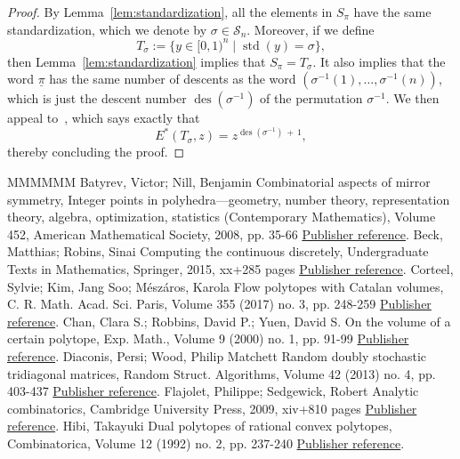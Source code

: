 \documentclass[11pt]{article}
\theoremstyle{definition}
\numberwithin{equation}{section}
\numberwithin{figure}{section}
\numberwithin{table}{section}
\DeclareMathOperator{\std}{std}
\DeclareMathOperator{\des}{des}
\newcommand{\calS}{\mathcal S}
\begin{document}
\begin{proof}
By Lemma~\ref{lem:standardization}, all the elements in $S_\pi$ have the same standardization, which we denote by $\sigma\in\calS_n$. Moreover, if we define
\[
T_\sigma:=\{ y\in[0,1)^n \mid \std(y)=\sigma \},
\]
then Lemma~\ref{lem:standardization} implies that $S_\pi=T_\sigma$. It also implies that the word $\underline{\pi}$ has the same number of descents as the word $(\sigma^{-1}(1),\ldots,\sigma^{-1}(n))$, which is just the descent number $\des(\sigma^{-1})$ of the permutation $\sigma^{-1}$. We then appeal to~\cite[Lemma~4]{HJV16}, which says exactly that
\[
E^*(T_{\sigma}, z) = z^{\des(\sigma^{-1})\,+\,1},
\]
thereby concluding the proof.
\end{proof}
\begin{thebibliography}{MMMMMM}
 Batyrev, Victor; Nill, Benjamin Combinatorial aspects of mirror symmetry, Integer points in polyhedra—geometry, number theory, representation theory, algebra, optimization, statistics (Contemporary Mathematics), Volume 452, American Mathematical Society, 2008, pp. 35-66 \href{https://ahl.centre-mersenne.org/item/AHL_2020__3__275_0/#BN08}{Publisher reference}.
 Beck, Matthias; Robins, Sinai Computing the continuous discretely, Undergraduate Texts in Mathematics, Springer, 2015, xx+285 pages \href{https://ahl.centre-mersenne.org/item/AHL_2020__3__275_0/#BR15}{Publisher reference}.
 Corteel, Sylvie; Kim, Jang Soo; Mészáros, Karola Flow polytopes with Catalan volumes, C. R. Math. Acad. Sci. Paris, Volume 355 (2017) no. 3, pp. 248-259 \href{https://ahl.centre-mersenne.org/item/AHL_2020__3__275_0/#CKM17}{Publisher reference}.
 Chan, Clara S.; Robbins, David P.; Yuen, David S. On the volume of a certain polytope, Exp. Math., Volume 9 (2000) no. 1, pp. 91-99 \href{https://ahl.centre-mersenne.org/item/AHL_2020__3__275_0/#CRY00}{Publisher reference}.
 Diaconis, Persi; Wood, Philip Matchett Random doubly stochastic tridiagonal matrices, Random Struct. Algorithms, Volume 42 (2013) no. 4, pp. 403-437 \href{https://ahl.centre-mersenne.org/item/AHL_2020__3__275_0/#DW13}{Publisher reference}.
 Flajolet, Philippe; Sedgewick, Robert Analytic combinatorics, Cambridge University Press, 2009, xiv+810 pages \href{https://ahl.centre-mersenne.org/item/AHL_2020__3__275_0/#FS09}{Publisher reference}.
 Hibi, Takayuki Dual polytopes of rational convex polytopes, Combinatorica, Volume 12 (1992) no. 2, pp. 237-240 \href{https://ahl.centre-mersenne.org/item/AHL_2020__3__275_0/#H92}{Publisher reference}.

\end{thebibliography}
\end{document}
